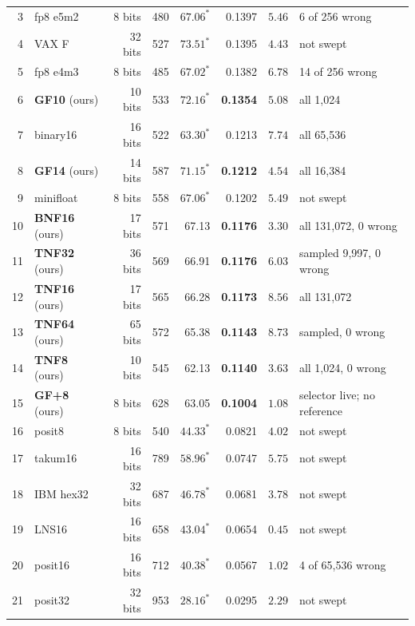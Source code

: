 \documentclass[11pt]{article}
\theoremstyle{definition}
\begin{document}
\begin{table}[t]
\begin{tabular}{rlrrrrrl}
3 & fp8 e5m2 & 8 bits & 480 & $67.06^{\ast}$ & 0.1397 & $5.46$ & 6 of 256 wrong \\
4 & VAX F & 32 bits & 527 & $73.51^{\ast}$ & 0.1395 & $4.43$ & not swept \\
5 & fp8 e4m3 & 8 bits & 485 & $67.02^{\ast}$ & 0.1382 & $6.78$ & 14 of 256 wrong \\
6 & \textbf{GF10} (ours) & 10 bits & 533 & $72.16^{\ast}$ & \textbf{0.1354} & $5.08$ & all 1{,}024 \\
7 & binary16 & 16 bits & 522 & $63.30^{\ast}$ & 0.1213 & $7.74$ & all 65{,}536 \\
8 & \textbf{GF14} (ours) & 14 bits & 587 & $71.15^{\ast}$ & \textbf{0.1212} & $4.54$ & all 16{,}384 \\
9 & minifloat & 8 bits & 558 & $67.06^{\ast}$ & 0.1202 & $5.49$ & not swept \\
10 & \textbf{BNF16} (ours) & 17 bits & 571 & 67.13 & \textbf{0.1176} & $3.30$ & all 131{,}072, 0 wrong \\
11 & \textbf{TNF32} (ours) & 36 bits & 569 & 66.91 & \textbf{0.1176} & $6.03$ & sampled 9{,}997, 0 wrong \\
12 & \textbf{TNF16} (ours) & 17 bits & 565 & 66.28 & \textbf{0.1173} & $8.56$ & all 131{,}072 \\
13 & \textbf{TNF64} (ours) & 65 bits & 572 & 65.38 & \textbf{0.1143} & $8.73$ & sampled, 0 wrong \\
14 & \textbf{TNF8} (ours) & 10 bits & 545 & 62.13 & \textbf{0.1140} & $3.63$ & all 1{,}024, 0 wrong \\
15 & \textbf{GF+8} (ours) & 8 bits & 628 & 63.05 & \textbf{0.1004} & $1.08$ & selector live; no reference \\
16 & posit8 & 8 bits & 540 & $44.33^{\ast}$ & 0.0821 & $4.02$ & not swept \\
17 & takum16 & 16 bits & 789 & $58.96^{\ast}$ & 0.0747 & $5.75$ & not swept \\
18 & IBM hex32 & 32 bits & 687 & $46.78^{\ast}$ & 0.0681 & $3.78$ & not swept \\
19 & LNS16 & 16 bits & 658 & $43.04^{\ast}$ & 0.0654 & $0.45$ & not swept \\
20 & posit16 & 16 bits & 712 & $40.38^{\ast}$ & 0.0567 & $1.02$ & 4 of 65{,}536 wrong \\
21 & posit32 & 32 bits & 953 & $28.16^{\ast}$ & 0.0295 & $2.29$ & not swept \\
\bottomrule
\end{tabular}
\end{table}
\end{document}
